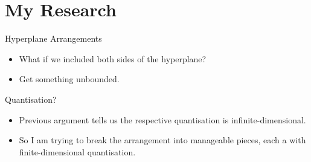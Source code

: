 \section{My Research}

\begin{frame}{Hyperplane Arrangements}

    \begin{itemize}
       \item What if we included both sides of the hyperplane?
       \item Get something unbounded.
    \end{itemize}

\end{frame}

\begin{frame}{Quantisation?}

    \begin{itemize}
       \item Previous argument tells us the respective quantisation is infinite-dimensional.
       \item So I am trying to break the arrangement into manageable pieces, each a with finite-dimensional quantisation.
    \end{itemize}

\end{frame}
